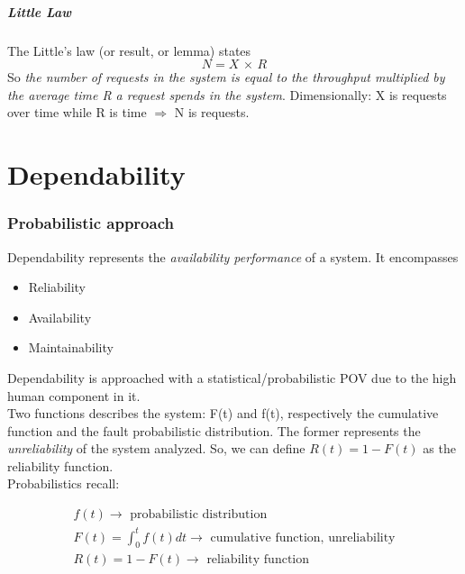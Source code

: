 \documentclass[10pt,a4paper]{article}
\begin{document}
				\subsubsection{Little Law}
					The Little's law (or result, or lemma) states
					\begin{equation}
						N = X \,\times\,R
					\end{equation}
					So \emph{the number of requests in the system is equal to the throughput multiplied by the average time R a request spends in the system}. Dimensionally: X is requests over time while R is time $\Rightarrow$ N is requests.
					
					
					
	\part{Dependability}
		\section{Probabilistic approach}
			Dependability represents the \emph{availability performance} of a system. It encompasses 
			\begin{itemize}
				\item Reliability
				\item Availability
				\item Maintainability
			\end{itemize}
			
			Dependability is approached with a statistical/probabilistic POV due to the high human component in it.\\
			Two functions describes the system: F(t) and f(t), respectively the cumulative function and the fault probabilistic distribution. The former represents the \emph{unreliability} of the system analyzed. So, we can define $R(t) =  1 - F(t)$ as the reliability function.\\
			Probabilistics recall:

			\begin{align}
				f(t) \rightarrow \text{ probabilistic distribution}\\
				F(t) = \int_{0}^{t}f(t)dt \rightarrow \text{ cumulative function, unreliability}\\
				R(t) = 1 - F(t) \rightarrow \text{ reliability function}
			\end{align}
\end{document}
